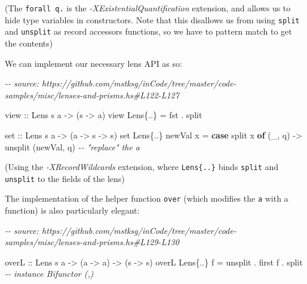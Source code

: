 \documentclass[]{article}
\newenvironment{Shaded}{}{}
\newcommand{\CommentTok}[1]{\textcolor[rgb]{0.38,0.63,0.69}{\textit{#1}}}
\newcommand{\DataTypeTok}[1]{\textcolor[rgb]{0.56,0.13,0.00}{#1}}
\newcommand{\FunctionTok}[1]{\textcolor[rgb]{0.02,0.16,0.49}{#1}}
\newcommand{\KeywordTok}[1]{\textcolor[rgb]{0.00,0.44,0.13}{\textbf{#1}}}
\newcommand{\NormalTok}[1]{#1}
\newcommand{\OperatorTok}[1]{\textcolor[rgb]{0.40,0.40,0.40}{#1}}
\newcommand{\OtherTok}[1]{\textcolor[rgb]{0.00,0.44,0.13}{#1}}
\begin{document}
(The \texttt{forall\ q.} is the \emph{-XExistentialQuantification} extension,
and allows us to hide type variables in constructors. Note that this disallows
us from using \texttt{split} and \texttt{unsplit} as record accessors functions,
so we have to pattern match to get the contents)

We can implement our necessary lens API as so:

\begin{Shaded}
\begin{Highlighting}[]
\CommentTok{{-}{-} source: https://github.com/mstksg/inCode/tree/master/code{-}samples/misc/lenses{-}and{-}prisms.hs\#L122{-}L127}

\OtherTok{view ::} \DataTypeTok{Lens\textquotesingle{}}\NormalTok{ s a }\OtherTok{{-}>}\NormalTok{ (s }\OtherTok{{-}>}\NormalTok{ a)}
\NormalTok{view }\DataTypeTok{Lens\textquotesingle{}}\NormalTok{\{}\OperatorTok{..}\NormalTok{\} }\OtherTok{=} \FunctionTok{fst} \OperatorTok{.}\NormalTok{ split}

\OtherTok{set ::} \DataTypeTok{Lens\textquotesingle{}}\NormalTok{ s a }\OtherTok{{-}>}\NormalTok{ (a }\OtherTok{{-}>}\NormalTok{ s }\OtherTok{{-}>}\NormalTok{ s)}
\NormalTok{set }\DataTypeTok{Lens\textquotesingle{}}\NormalTok{\{}\OperatorTok{..}\NormalTok{\} newVal x }\OtherTok{=} \KeywordTok{case}\NormalTok{ split x }\KeywordTok{of}
\NormalTok{    (\_, q) }\OtherTok{{-}>}\NormalTok{ unsplit (newVal, q)      }\CommentTok{{-}{-} "replace" the \textasciigrave{}a\textasciigrave{}}
\end{Highlighting}
\end{Shaded}

(Using the \emph{-XRecordWildcards} extension, where
\texttt{Lens\textquotesingle{}\{..\}} binds \texttt{split} and \texttt{unsplit}
to the fields of the lens)

The implementation of the helper function \texttt{over} (which modifies the
\texttt{a} with a function) is also particularly elegant:

\begin{Shaded}
\begin{Highlighting}[]
\CommentTok{{-}{-} source: https://github.com/mstksg/inCode/tree/master/code{-}samples/misc/lenses{-}and{-}prisms.hs\#L129{-}L130}

\OtherTok{overL ::} \DataTypeTok{Lens\textquotesingle{}}\NormalTok{ s a }\OtherTok{{-}>}\NormalTok{ (a }\OtherTok{{-}>}\NormalTok{ a) }\OtherTok{{-}>}\NormalTok{ (s }\OtherTok{{-}>}\NormalTok{ s)}
\NormalTok{overL }\DataTypeTok{Lens\textquotesingle{}}\NormalTok{\{}\OperatorTok{..}\NormalTok{\}  f }\OtherTok{=}\NormalTok{ unsplit }\OperatorTok{.}\NormalTok{ first f }\OperatorTok{.}\NormalTok{ split   }\CommentTok{{-}{-} instance Bifunctor (,)}
\end{Highlighting}
\end{Shaded}
\end{document}
